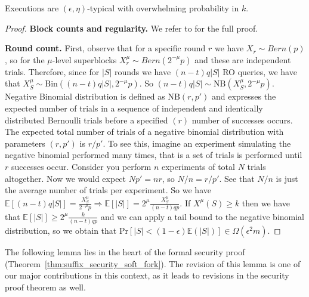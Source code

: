 \begin{thm}[Typicality]\label{thm:superblock_typicality}
	Executions are $(\epsilon, \eta)$-typical with overwhelming probability in $k$.
\end{thm}
\begin{proof}
	\textbf{Block counts and regularity.} We refer to \cite{backbone} for
	the full proof.

	\textbf{Round count.} First, observe that for a specific round $r$ we have $X_{r}
	\sim Bern(p)$, so for the $\mu$-level superblocks $X_{r}^\mu \sim Bern(2^{-\mu}p)$
	and these are independent trials. Therefore, since for $\vert S \vert$ rounds we
	have $(n-t)q\vert S \vert$ RO queries, we have that $X_S^\mu \sim
	\text{Bin}((n-t)q \vert S \vert, 2^{-\mu}p)$. So $(n-t)q \vert S \vert \sim
	\text{NB}(X_S^\mu, 2^{-\mu}p)$. Negative Binomial distribution is defined
	as $\text{NB}(r, p')$ and expresses the expected number of trials in a sequence of
	independent and identically distributed Bernoulli trials before a specified
	$(r)$ number of successes occurs. The expected total number of trials of a
	negative binomial distribution with parameters $(r, p')$ is $r/p'$. To see
	this, imagine an experiment simulating the negative binomial performed many
	times, that is a set of trials is performed until $r$ successes occur. Consider
	you perform $n$ experiments of total $N$ trials altogether. Now we would expect $Np' = nr$,
	so $N/n = r/p'$. See that $N/n$ is just the average number of trials per
	experiment. So we have $\mathbb{E}[(n-t)q \vert S \vert] = \frac{X^\mu_S}{2^{-\mu}p}
	\Rightarrow \mathbb{E}[\vert S \vert] = 2^\mu \frac{X^\mu_S}{(n-t)qp}$. If $X^\mu(S) \geq k$
	then we have that $\mathbb{E}[\vert S \vert] \geq 2^\mu \frac{k}{(n-t)qp}$ and we can apply a tail bound to the
	negative binomial distribution, so we obtain that $\text{Pr}[\vert S \vert < (1 -
	\epsilon)\mathbb{E}(\vert S \vert)] \in \Omega(\epsilon^{2}m)$.
\end{proof}

The following lemma lies in the heart of the formal security proof (Theorem~\ref{thm:suffix_security_soft_fork}). The revision of this lemma is one of our major contributions in this context, as it leads to revisions in the security proof theorem as well.

